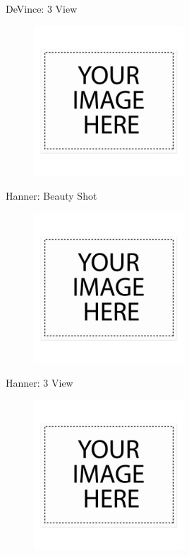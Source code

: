 \documentclass[10pt]{beamer}
\begin{document}
\begin{frame}{DeVince: 3 View}
\begin{figure}
\centering
\includegraphics[width=0.5\textwidth]{DeVince_3_View.png}
\end{figure}
\end{frame}

	\begin{frame}{Hanner: Beauty Shot}
\begin{figure}
	\centering
	\includegraphics[width=0.5\textwidth]{Hanner_Beauty.png}
\end{figure}
\end{frame}

\begin{frame}{Hanner: 3 View}
\begin{figure}
\centering
\includegraphics[width=0.5\textwidth]{Hanner_3_View.png}
\end{figure}
\end{frame}
\end{document}
